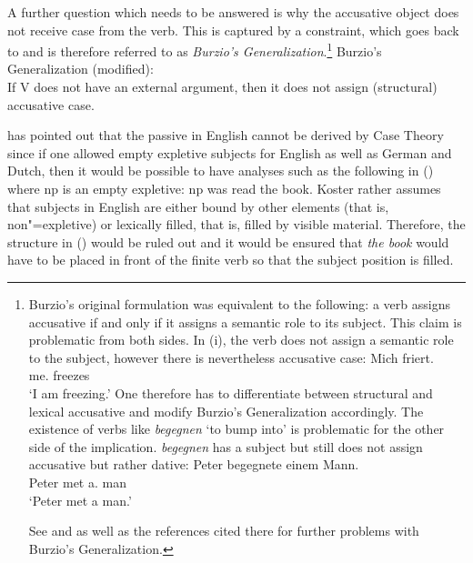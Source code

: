 A further question which needs to be answered is why the accusative object does not receive case from the verb.
This is captured by a constraint, which goes back to \citet[--185]{Burzio86a-u-gekauft} and is therefore
referred to as \emph{Burzio's Generalization}.\footnote{%
Burzio's original formulation was equivalent to the following: a verb assigns accusative if and only if it assigns
a semantic role to its subject.
This claim is problematic from both sides. In (i), the verb does not assign a semantic role to the subject, however
there is nevertheless accusative case:
\ea
\gll Mich friert.\\
	 me.\acc{} freezes\\
\glt `I am freezing.'
\z
One therefore has to differentiate between structural and lexical accusative and modify Burzio's Generalization
accordingly. The existence of verbs like \emph{begegnen} `to bump into' is problematic for the other side of
the implication. \emph{begegnen} has a subject but still does not assign accusative but rather
dative:
\ea
\gll Peter begegnete einem Mann.\\
     Peter met a.\dat{} man\\
\glt `Peter met a man.'
\z

See  and  as well as the references cited there for further problems
with Burzio's Generalization.
}
\ea
Burzio's Generalization (modified):\\
If V does not have an external argument, then it does not assign (structural) accusative case.
\z

\noindent
\citet[]{Koster86a} has pointed out that the passive in English cannot be derived by Case
Theory since if one allowed empty expletive subjects for English as well as German and Dutch, then it would be possible
to have analyses such as the following in () where np is an empty expletive:
\ea
np was read the book.
\z
Koster rather assumes that subjects in English are either bound by other elements (that is, non"=expletive) or lexically filled, that
is, filled by visible material.
Therefore, the structure in () would be ruled out and it would be ensured that \emph{the book} would have to be placed in front
of the finite verb so that the subject position is filled.

